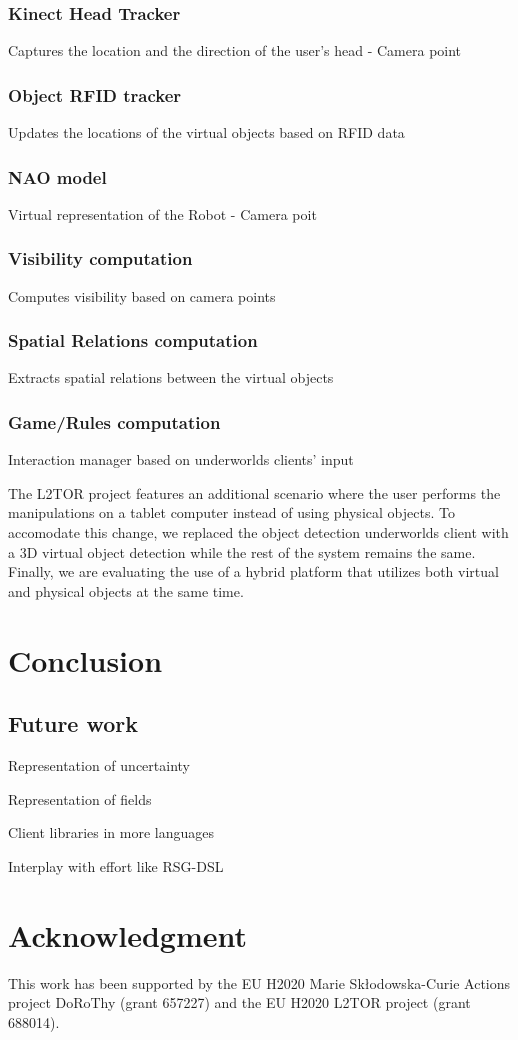 \documentclass[letterpaper, 10 pt, conference]{ieeeconf}  %
\newcommand{\uwds}{{\sc underworlds}\xspace}
\begin{document}
\subsubsection{Kinect Head Tracker} {Captures the location and the direction of the user's head - Camera point}
\subsubsection{Object RFID tracker} {Updates the locations of the virtual objects based on RFID data}
\subsubsection{NAO model}{Virtual representation of the Robot - Camera poit}
\subsubsection{Visibility computation}{Computes visibility based on camera points}
\subsubsection{Spatial Relations computation}{Extracts spatial relations between the virtual objects}
\subsubsection{Game/Rules computation}{Interaction manager based on \uwds clients' input}

The L2TOR project features an additional scenario where the user performs the manipulations on a tablet computer instead of using physical objects. To accomodate this change, we replaced the object detection \uwds client with a 3D virtual object detection while the rest of the system remains the same. Finally, we are evaluating the use of a hybrid platform that utilizes both virtual and physical objects at the same time. 


\section{Conclusion}

\subsection{Future work}
\label{futurework}

Representation of uncertainty

Representation of fields

Client libraries in more languages


Interplay with effort like RSG-DSL~\cite{blumenthal2014towards}

\section*{Acknowledgment}

This work has been supported by the EU H2020 Marie Sk\l odowska-Curie Actions
project DoRoThy (grant 657227) and the EU H2020 L2TOR project (grant 688014).




\end{document}
